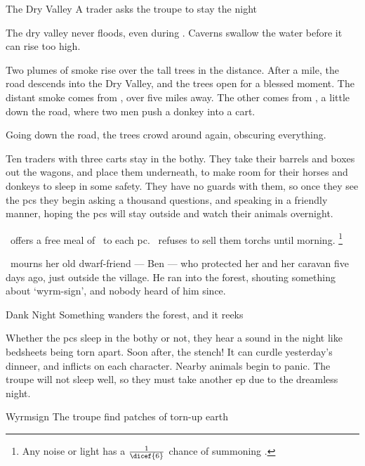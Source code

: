 \documentclass[10pt,twoside]{book}
\begin{document}
{The Dry Valley}%
{A trader asks the troupe to stay the night}%

The dry valley never floods, even during .
Caverns swallow the water before it can rise too high.

\begin{boxtext}
  Two plumes of smoke rise over the tall trees in the distance.
  After a mile, the road descends into the Dry Valley, and the trees open for a blessed moment.
  The distant smoke comes from , over five miles away.
  The other comes from , a little down the road, where two men push a donkey into a cart.

  Going down the road, the trees crowd around again, obscuring everything.
\end{boxtext}

Ten traders with three carts stay in the \gls{bothy}.
They take their barrels and boxes out the wagons, and place them underneath, to make room for their horses and donkeys to sleep in some safety.
They have no \glspl{guard} with them, so once they see the \glspl{pc} they begin asking a thousand questions, and speaking in a friendly manner, hoping the \glspl{pc} will stay outside and watch their animals overnight.

\composeHumanName\ offers a free meal of \rations\ to each \gls{pc}.
\composeHumanName\ refuses to sell them \glspl{torch} until morning.%
\footnote{Any noise or light has a $\frac{1}{\dicef{6}}$ chance of summoning .}

\currentName\ mourns her old dwarf-friend --- Ben --- who protected her and her caravan five days ago, just outside the \gls{village}.
He ran into the forest, shouting something about `wyrm-sign', and nobody heard of him since.

{Dank Night}%
{Something wanders the forest, and it reeks}%
\label{dankNight}

Whether the \glspl{pc} sleep in the \gls{bothy} or not, they hear a sound in the night like bedsheets being torn apart.
Soon after, the stench!
It can curdle yesterday's dinneer, and inflicts  on each character.
Nearby animals begin to panic.
The troupe will not sleep well, so they must take another \gls{ep} due to the dreamless night.

{Wyrmsign}%
{The troupe find patches of torn-up earth}%
\end{document}
